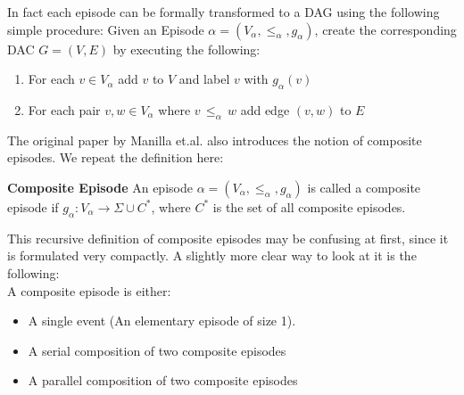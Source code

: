 %

In fact each episode can be formally transformed to a DAG using the following simple procedure: Given an Episode $\alpha = (V_\alpha,{\leq}_{\alpha},g_\alpha)$, create the corresponding DAC $G = (V,E)$ by executing the following:

\begin{enumerate}
	\item For each $v \in V_\alpha$ add $v$ to $V$ and label $v$ with $g_\alpha (v)$
	\item For each pair $v,w \in V_\alpha$ where $v \, {\leq}_{\alpha} \, w $ add edge $(v,w)$ to $E$
\end{enumerate}

The original paper by Manilla et.al. \cite{mannila1995discovering} also introduces the notion of composite episodes. We repeat the definition here:

\begin{mydef}
\label{def_compositeEpisodes}
\textbf{Composite Episode} An episode $\alpha = (V_\alpha,{\leq}_{\alpha},g_\alpha)$ is called a composite episode if $g_\alpha : V_\alpha \rightarrow \Sigma \cup C^*$, where $C^*$ is the set of all composite episodes. \cite{mannila1995discovering}
\end{mydef}

This recursive definition of composite episodes may be confusing at first, since it is formulated very compactly. A slightly more clear way to look at it is the following:\\
A composite episode is either:
\begin{itemize}
	\item A single event (An elementary episode of size 1).
	\item A serial composition of two composite episodes
	\item A parallel composition of two composite episodes
\end{itemize}

